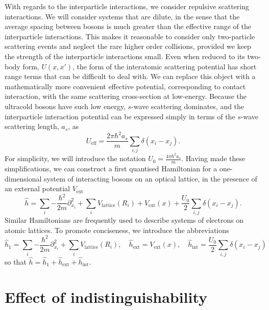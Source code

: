 \documentclass[a4paper, 10pt, draft]{article}
\theoremstyle{plain}
\begin{document}
With regards to the interparticle interactions, we consider repulsive scattering
interactions. We will consider systems that are dilute, in the sense that the
average spacing between bosons is much greater than the effective range of the
interparticle interactions. This makes it reasonable to consider only
two-particle scattering events and neglect the rare higher order collisions,
provided we keep the strength of the interparticle interactions small. Even when
reduced to its two-body form, $U(x,x')$, the form of the interatomic scattering
potential has short range terms that can be difficult to deal with. We can
replace this object with a mathematically more convenient effective potential,
corresponding to contact interaction, with the same scattering cross-section at
low-energy. Because the ultracold bosons have such low energy, $s$-wave
scattering dominates, and the interparticle interaction potential can be
expressed simply in terms of the $s$-wave scattering length, $a_{s}$, as
\begin{equation}
    U_{\text{eff}}
    =
    \frac{2 \pi\hbar^{2} a_{s}}{m}
    \sum_{i,j}{\delta(x_{i} - x_{j})}.
\end{equation}
For simplicity, we will introduce the notation $U_{0} = \frac{4 \pi \hbar^{2}
a_{s}}{m}$. Having made these simplifications, we can construct a first
quantised Hamiltonian for a one-dimensional system of interacting bosons on an
optical lattice, in the presence of an external potential $V_{\text{ext}}$
\begin{equation}
    \label{eq:HamiltonianCoordinateRepresentation}
    \hat{h}
    =
    \sum_{i}{-\frac{\hbar^{2}}{2m}  \partial_{x_{i}}^{2}} +
    \sum_{i}{V_{\text{lattice}}(R_{i})} +
    V_{\text{ext}}(x) +
    \frac{U_{0}}{2} \sum_{i,j}{\delta(x_{i} - x_{j})}.
\end{equation}
Similar Hamiltonians are frequently used to describe systems of electrons on
atomic lattices. To promote conciseness, we introduce the abbreviations
\begin{equation*}
    \hat{h}_{1}
    =
    \sum_{i}{-\frac{\hbar^{2}}{2m} \partial_{x_{i}}^{2}} +
    \sum_{i}{V_{\text{lattice}}(R_{i})},
    \quad
    \hat{h}_{\text{ext}}
    =
    V_{\text{ext}}(x),
    \quad
    \hat{h}_{\text{int}}
    =
    \frac{U_{0}}{2} \sum_{i,j}\delta{(x_{i}-x_{j})}
\end{equation*}
so that $\hat{h}=\hat{h}_1+\hat{h}_{\text{ext}}+\hat{h}_{\text{int}}$.


\section{Effect of indistinguishability}
\end{document}
